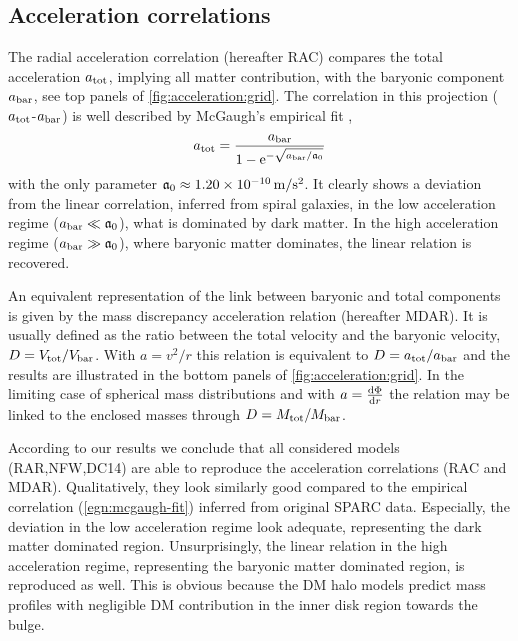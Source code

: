 \subsection{Acceleration correlations}
\label{sec:result:ac}
The radial acceleration correlation (hereafter RAC) compares the total acceleration $a_\mathrm{tot}$, implying all matter contribution, with the baryonic component $a_\mathrm{bar}$, see top panels of \cref{fig:acceleration:grid}. The correlation in this projection ($a_\mathrm{tot}$-$a_\mathrm{bar}$) is well described by McGaugh's empirical fit \citet{2016arXiv160905917M}, \begin{equation}
	\label{egn:mcgaugh-fit}
	\SYMatot = \frac{\SYMabar}{1 - \e^{-\sqrt{\SYMabar/{\SYMafrak}}}}
\end{equation} with the only parameter $\mathfrak{a}_0 \approx \SI{1.20E-10}{\metre/\second^2}$. It clearly shows a deviation from the linear correlation, inferred from spiral galaxies, in the low acceleration regime ($a_\mathrm{bar} \ll \mathfrak{a}_0$), what is dominated by dark matter. In the high acceleration regime ($a_\mathrm{bar} \gg \mathfrak{a}_0$), where baryonic matter dominates, the linear relation is recovered.


An equivalent representation of the link between baryonic and total components is given by the mass discrepancy acceleration relation (hereafter MDAR). It is usually defined as the ratio between the total velocity and the baryonic velocity, $D = V_\mathrm{tot}/V_\mathrm{bar}$. With $a = v^2/r$ this relation is equivalent to $D = a_\mathrm{tot}/a_\mathrm{bar}$ and the results are illustrated in the bottom panels of \cref{fig:acceleration:grid}. In the limiting case of spherical mass distributions and with $a = \frac{\mathrm{d}\Phi}{\mathrm{d} r}$ the relation may be linked to the enclosed masses through $D = M_{\rm tot}/M_{\rm bar}$.

According to our results we conclude that all considered models (RAR,NFW,DC14) are able to reproduce the acceleration correlations (RAC and MDAR). Qualitatively, they look similarly good compared to the empirical correlation (\ref{egn:mcgaugh-fit}) inferred from original SPARC data. Especially, the deviation in the low acceleration regime look adequate, representing the dark matter dominated region. Unsurprisingly, the linear relation in the high acceleration regime, representing the baryonic matter dominated region, is reproduced as well. This is obvious because the DM halo models predict mass profiles with negligible DM contribution in the inner disk region towards the bulge.

